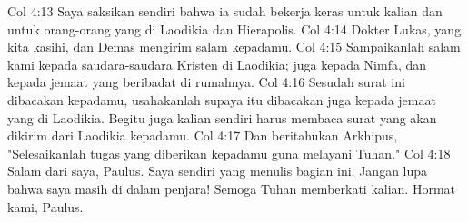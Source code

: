 Col 4:13  Saya saksikan sendiri bahwa ia sudah bekerja keras untuk kalian dan untuk orang-orang yang di Laodikia dan Hierapolis.
Col 4:14  Dokter Lukas, yang kita kasihi, dan Demas mengirim salam kepadamu.
Col 4:15  Sampaikanlah salam kami kepada saudara-saudara Kristen di Laodikia; juga kepada Nimfa, dan kepada jemaat yang beribadat di rumahnya.
Col 4:16  Sesudah surat ini dibacakan kepadamu, usahakanlah supaya itu dibacakan juga kepada jemaat yang di Laodikia. Begitu juga kalian sendiri harus membaca surat yang akan dikirim dari Laodikia kepadamu.
Col 4:17  Dan beritahukan Arkhipus, "Selesaikanlah tugas yang diberikan kepadamu guna melayani Tuhan."
Col 4:18  Salam dari saya, Paulus. Saya sendiri yang menulis bagian ini. Jangan lupa bahwa saya masih di dalam penjara! Semoga Tuhan memberkati kalian. Hormat kami, Paulus.


